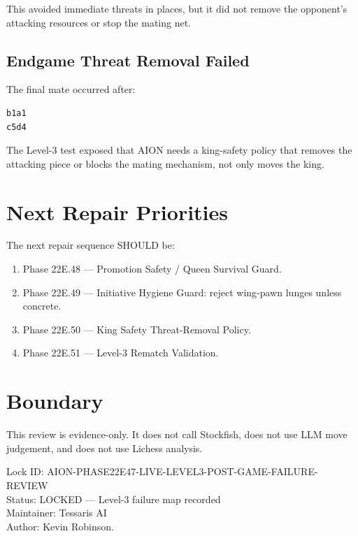 \documentclass[11pt,a4paper]{article}
\begin{document}
This avoided immediate threats in places, but it did not remove the opponent's attacking resources or stop the mating net.

\subsection{Endgame Threat Removal Failed}

The final mate occurred after:

\begin{verbatim}
b1a1
c5d4
\end{verbatim}

The Level-3 test exposed that AION needs a king-safety policy that removes the attacking piece or blocks the mating mechanism, not only moves the king.

\section{Next Repair Priorities}

The next repair sequence SHOULD be:

\begin{enumerate}
  \item Phase 22E.48 --- Promotion Safety / Queen Survival Guard.
  \item Phase 22E.49 --- Initiative Hygiene Guard: reject wing-pawn lunges unless concrete.
  \item Phase 22E.50 --- King Safety Threat-Removal Policy.
  \item Phase 22E.51 --- Level-3 Rematch Validation.
\end{enumerate}

\section{Boundary}

This review is evidence-only. It does not call Stockfish, does not use LLM move judgement, and does not use Lichess analysis.

\bigskip

\noindent
Lock ID: AION-PHASE22E47-LIVE-LEVEL3-POST-GAME-FAILURE-REVIEW\\
Status: LOCKED --- Level-3 failure map recorded\\
Maintainer: Tessaris AI\\
Author: Kevin Robinson.
\end{document}
